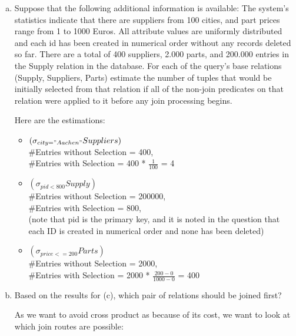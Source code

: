 \documentclass[10pt]{article}
\begin{document}
\begin{enumerate}
\begin{enumerate}[(a)]
					\item Suppose that the following additional information is available: The system’s statistics
					indicate that there are suppliers from 100 cities, and part prices range from 1 to 1000
					Euros. All attribute values are uniformly distributed and each id has been created in
					numerical order without any records deleted so far. There are a total of 400 suppliers,
					2.000 parts, and 200.000 entries in the Supply relation in the database.
					For each of the query’s base relations (Supply, Suppliers, Parts) estimate the number of
					tuples that would be initially selected from that relation if all of the non-join predicates
					on that relation were applied to it before any join processing begins.
					
					\bigskip
					Here are the estimations:
					
					\begin{itemize}
						\item $( \sigma_{city="Aachen"} Suppliers)$\\
						\#Entries without Selection = 400, \\
						\#Entries with Selection = 400 * $\frac{1}{100}$ = 4\\
						
						\item $(\sigma_{pid < 800}Supply) $\\
						\#Entries without Selection = 200000, \\
						\#Entries with Selection = 800,\\
						(note that pid is the primary key, and it is noted in the question that each ID is created in numerical order and none has been deleted)\\
						
						\item $(\sigma_{price <= 200}Parts)$\\
						\#Entries without Selection = 2000, \\
						\#Entries with Selection = 2000 * $\frac{200 - 0}{1000-0}$ = 400\\
					\end{itemize}
					
					
					\bigskip
					
					\item Based on the results for (c), which pair of relations should be joined first?
					
					As we want to avoid cross product as because of its cost, we want to look at which join routes are possible:
					

\end{enumerate}
\end{enumerate}
\end{document}

